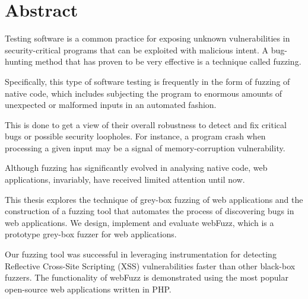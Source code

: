 \section*{\LARGE{Abstract}}

Testing software is a common practice for exposing unknown vulnerabilities
in security-critical programs that can be exploited with malicious intent.
A bug-hunting method that has proven to be very effective is a technique
called fuzzing. 

Specifically, this type of software testing is frequently in the
form of fuzzing of native code, which includes subjecting the program to
enormous amounts of unexpected or malformed inputs in an automated fashion.

This is done to get a view of their overall robustness to detect and fix
critical bugs or possible security loopholes. For instance, a program crash
when processing a given input may be a signal of memory-corruption
vulnerability.

Although fuzzing has significantly evolved in analysing native code, web
applications, invariably, have received limited attention until now. 

This thesis explores the technique of grey-box fuzzing of web applications and the
construction of a fuzzing tool that automates the process of discovering
bugs in web applications. We design, implement and evaluate webFuzz, which is a prototype grey-box
fuzzer for web applications. 

Our fuzzing tool was successful in leveraging instrumentation for detecting Reflective Cross-Site Scripting (XSS) vulnerabilities faster than other
black-box fuzzers. The functionality of webFuzz is demonstrated using the most popular open-source web applications written in PHP.